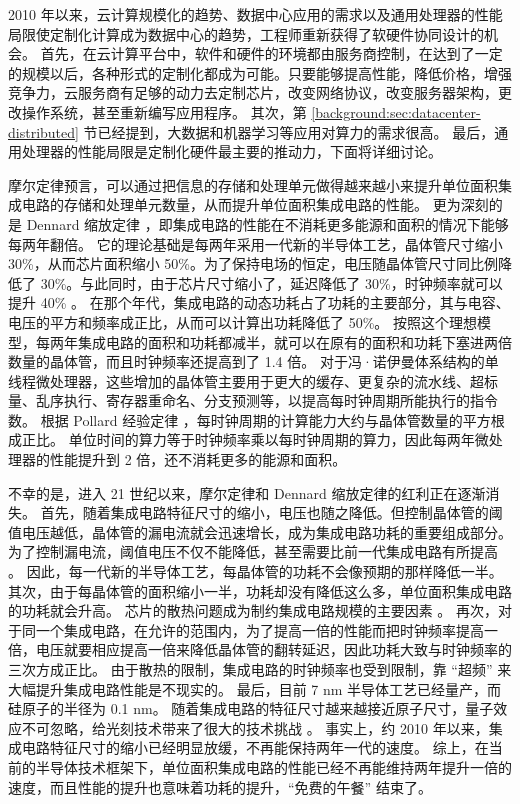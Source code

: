 2010 年以来，云计算规模化的趋势、数据中心应用的需求以及通用处理器的性能局限使定制化计算成为数据中心的趋势，工程师重新获得了软硬件协同设计的机会。
首先，在云计算平台中，软件和硬件的环境都由服务商控制，在达到了一定的规模以后，各种形式的定制化都成为可能。只要能够提高性能，降低价格，增强竞争力，云服务商有足够的动力去定制芯片，改变网络协议，改变服务器架构，更改操作系统，甚至重新编写应用程序。
其次，第 \ref{background:sec:datacenter-distributed} 节已经提到，大数据和机器学习等应用对算力的需求很高。
最后，通用处理器的性能局限是定制化硬件最主要的推动力，下面将详细讨论。

摩尔定律预言，可以通过把信息的存储和处理单元做得越来越小来提升单位面积集成电路的存储和处理单元数量，从而提升单位面积集成电路的性能。
更为深刻的是 Dennard 缩放定律 \cite{dennard1974design}，即集成电路的性能在不消耗更多能源和面积的情况下能够每两年翻倍。
它的理论基础是每两年采用一代新的半导体工艺，晶体管尺寸缩小 30\%，从而芯片面积缩小 50\%。为了保持电场的恒定，电压随晶体管尺寸同比例降低了 30\%。与此同时，由于芯片尺寸缩小了，延迟降低了 30\%，时钟频率就可以提升 40\% \cite{borkar1999design,borkar2011future}。
在那个年代，集成电路的动态功耗占了功耗的主要部分，其与电容、电压的平方和频率成正比，从而可以计算出功耗降低了 50\%。
按照这个理想模型，每两年集成电路的面积和功耗都减半，就可以在原有的面积和功耗下塞进两倍数量的晶体管，而且时钟频率还提高到了 1.4 倍。
对于冯·诺伊曼体系结构的单线程微处理器，这些增加的晶体管主要用于更大的缓存、更复杂的流水线、超标量、乱序执行、寄存器重命名、分支预测等，以提高每时钟周期所能执行的指令数。
根据 Pollard 经验定律 \cite{pollackpollack}，每时钟周期的计算能力大约与晶体管数量的平方根成正比。
单位时间的算力等于时钟频率乘以每时钟周期的算力，因此每两年微处理器的性能提升到 2 倍，还不消耗更多的能源和面积。

不幸的是，进入 21 世纪以来，摩尔定律和 Dennard 缩放定律的红利正在逐渐消失。
首先，随着集成电路特征尺寸的缩小，电压也随之降低。但控制晶体管的阈值电压越低，晶体管的漏电流就会迅速增长，成为集成电路功耗的重要组成部分。
为了控制漏电流，阈值电压不仅不能降低，甚至需要比前一代集成电路有所提高 \cite{borkar1999design}。
因此，每一代新的半导体工艺，每晶体管的功耗不会像预期的那样降低一半。
其次，由于每晶体管的面积缩小一半，功耗却没有降低这么多，单位面积集成电路的功耗就会升高。
芯片的散热问题成为制约集成电路规模的主要因素 \cite{borkar2011future}。
再次，对于同一个集成电路，在允许的范围内，为了提高一倍的性能而把时钟频率提高一倍，电压就要相应提高一倍来降低晶体管的翻转延迟，因此功耗大致与时钟频率的三次方成正比。
由于散热的限制，集成电路的时钟频率也受到限制，靠 ``超频'' 来大幅提升集成电路性能是不现实的。
最后，目前 7 nm 半导体工艺已经量产，而硅原子的半径为 0.1 nm。
随着集成电路的特征尺寸越来越接近原子尺寸，量子效应不可忽略，给光刻技术带来了很大的技术挑战 \cite{borkar2011future}。
事实上，约 2010 年以来，集成电路特征尺寸的缩小已经明显放缓，不再能保持两年一代的速度。
综上，在当前的半导体技术框架下，单位面积集成电路的性能已经不再能维持两年提升一倍的速度，而且性能的提升也意味着功耗的提升，``免费的午餐'' 结束了。

